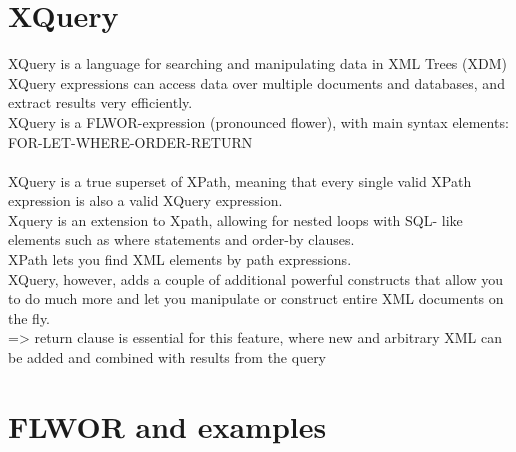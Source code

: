 \section{XQuery}
XQuery is a language for searching and manipulating data in XML Trees (XDM)\\
XQuery expressions can access data over multiple documents and databases, and extract results very efficiently.\\
XQuery is a FLWOR-expression (pronounced flower), with main syntax elements:\\FOR-LET-WHERE-ORDER-RETURN\\
\\
XQuery is a true superset of XPath, meaning that every single valid
XPath expression is also a valid XQuery expression.\\
Xquery is an extension to Xpath, allowing for nested loops with SQL- like elements such as where statements and order-by clauses.\\
XPath lets you find XML elements by path expressions.\\
XQuery, however, adds a couple of additional powerful constructs that allow you to do much more and let you manipulate or construct entire XML documents on the fly.\\
  => return clause is essential for this feature, where new and arbitrary XML can be added and combined with results from the query

\section{FLWOR and examples}


